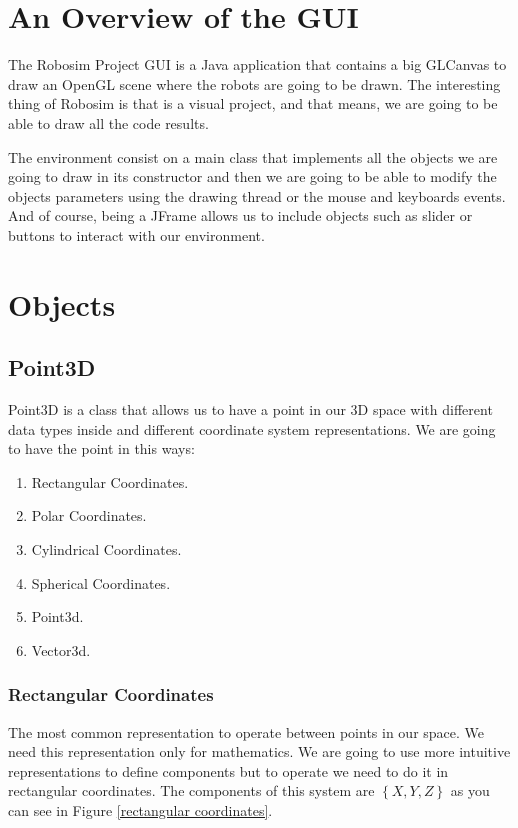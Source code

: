 \documentclass[12pt,a4paper,oneside,english]{book}
\begin{document}
\chapter{An Overview of the GUI}

The Robosim Project GUI is a Java application that contains a big GLCanvas to draw an OpenGL scene where the robots are going to be drawn. The interesting thing of Robosim is that is a visual project, and that means, we are going to be able to draw all the code results.

The environment consist on a main class that implements all the objects we are going to draw in its constructor and then we are going to be able to modify the objects parameters using the drawing thread or the mouse and keyboards events. And of course, being a JFrame allows us to include objects such as slider or buttons to interact with our environment.

\chapter{Objects}

\section{Point3D}

Point3D is a class that allows us to have a point in our 3D space with different data types inside and different coordinate system representations. We are going to have the point in this ways:

\begin{enumerate}
\item Rectangular Coordinates.
\item Polar Coordinates.
\item Cylindrical Coordinates.
\item Spherical Coordinates.
\item Point3d.
\item Vector3d.
\end{enumerate}

\newpage

\subsection{Rectangular Coordinates}

The most common representation to operate between points in our space. We need this representation only for mathematics. We are going to use more intuitive representations to define components but to operate we need to do it in rectangular coordinates. The components of this system are $\left\{X,Y,Z\right\}$  as you can see in Figure \ref{rectangular coordinates}.
\end{document}
